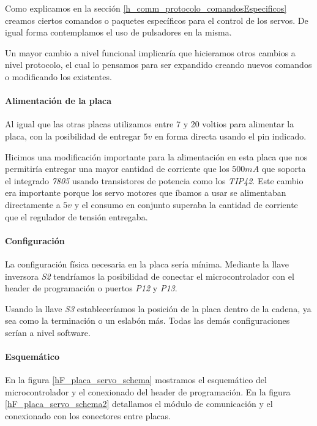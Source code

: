 Como explicamos en la secci\'on \ref{h_comm_protocolo_comandosEspecificos} creamos ciertos comandos
o paquetes espec\'ificos para el control de los servos.
De igual forma contemplamos el uso de pulsadores en la misma.

Un mayor cambio a nivel funcional implicar\'ia que hicieramos otros cambios a nivel protocolo, el cual
lo pensamos para ser expandido creando nuevos comandos o modificando los existentes.

\paragraph{Alimentaci\'on de la placa}
\label{h_placas_servos_alimentacion}

Al igual que las otras placas utilizamos entre 7 y 20 voltios para alimentar la placa, con la posibilidad
de entregar $5v$ en forma directa usando el pin indicado.

Hicimos una modificaci\'on importante para la alimentaci\'on en esta placa que nos permitir\'ia entregar
una mayor cantidad de corriente que los $500 mA$ que soporta el integrado \emph{7805} usando transistores
de potencia como los \emph{TIP42}.
Este cambio era importante porque los servo motores que \'ibamos a usar se alimentaban directamente a $5v$
y el consumo en conjunto superaba la cantidad de corriente que el regulador de tensi\'on entregaba.

\paragraph{Configuraci\'on}
\label{h_placas_servos_config}

La configuraci\'on f\'isica necesaria en la placa ser\'ia m\'inima.
Mediante la llave inversora \emph{S2} tendr\'iamos la posibilidad de conectar el microcontrolador
con el header de programaci\'on o puertos \emph{P12} y \emph{P13}.

Usando la llave \emph{S3} establecer\'iamos la posici\'on de la placa dentro de la cadena, ya sea
como la terminaci\'on o un eslab\'on m\'as.
Todas las dem\'as configuraciones ser\'ian a nivel software.

\paragraph{Esquem\'atico}
\label{h_placas_servos_esquematico}

En la figura \ref{hF_placa_servo_schema} mostramos el esquem\'atico del microcontrolador y el conexionado
del header de programaci\'on.
En la figura \ref{hF_placa_servo_schema2} detallamos el m\'odulo de comunicaci\'on y el conexionado con
los conectores entre placas.

